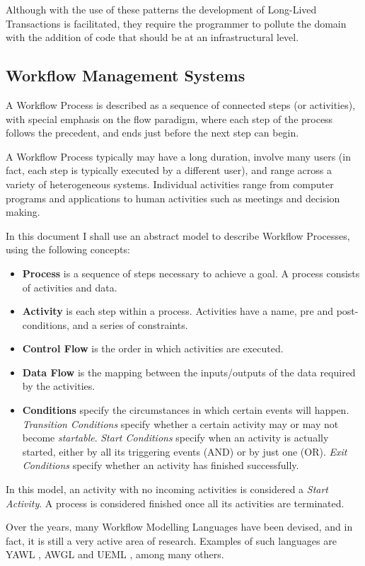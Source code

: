 \documentclass{llncs}
\begin{document}
Although with the use of these patterns the development of Long-Lived
Transactions is facilitated, they require the programmer to pollute
the domain with the addition of code that should be at an
infrastructural level.

\subsection{Workflow Management Systems}

A Workflow Process is described as a sequence of connected steps (or
activities), with special emphasis on the flow paradigm, where each
step of the process follows the precedent, and ends just before the
next step can begin.

A Workflow Process typically may have a long duration, involve many
users (in fact, each step is typically executed by a different user),
and range across a variety of heterogeneous systems. Individual
activities range from computer programs and applications to human
activities such as meetings and decision making.

In this document I shall use an abstract model to describe Workflow
Processes, using the following concepts:
\begin{itemize}
\item {\bf Process} is a sequence of steps necessary to achieve a
  goal. A process consists of activities and data.
\item {\bf Activity} is each step within a process. Activities have a
  name, pre and post-conditions, and a series of constraints.
\item {\bf Control Flow} is the order in which activities are
  executed.
\item {\bf Data Flow} is the mapping between the inputs/outputs of the
  data required by the activities.
\item {\bf Conditions} specify the circumstances in which certain
  events will happen. {\it Transition Conditions} specify whether a
  certain activity may or may not become {\it startable}. {\it Start
    Conditions} specify when an activity is actually started, either
  by all its triggering events (AND) or by just one (OR). {\it Exit
    Conditions} specify whether an activity has finished successfully.
\end{itemize}
In this model, an activity with no incoming activities is considered a
{\it Start Activity}. A process is considered finished once all its
activities are terminated.

Over the years, many Workflow Modelling Languages have been devised,
and in fact, it is still a very active area of research. Examples of
such languages are YAWL \cite{van2005yawl}, AWGL
\cite{fahringer2005specification} and UEML \cite{vernadat2002ueml}, among
many others.
\end{document}
